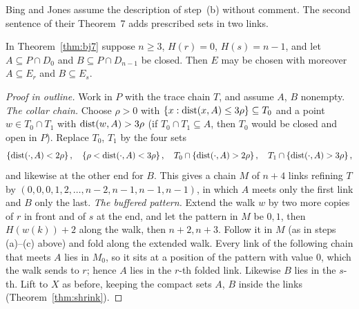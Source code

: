 
Bing and Jones assume the description of step~(b) without comment. The second sentence of their Theorem~7 adds prescribed sets in two links.

\begin{theorem}\label{thm:bj7-ends}
In Theorem~\ref{thm:bj7} suppose $n\ge3$, $H(r)=0$, $H(s)=n-1$, and let $A\subseteq P\cap D_0$ and $B\subseteq P\cap D_{n-1}$ be closed. Then $E$ may be chosen with
moreover $A\subseteq E_r$ and $B\subseteq E_s$.
\end{theorem}

\begin{proof}[Proof in outline]
Work in $P$ with the trace chain $T$, and assume $A$, $B$ nonempty.
\emph{The collar chain.} Choose $\rho>0$ with $\left\{ x:\operatorname{dist}(x,A)\le3\rho \right\}\subseteq T_0$ and a point $w\in T_0\cap T_1$ with $\operatorname{dist}(w,A)>3\rho$ (if $T_0\cap T_1\subseteq
A$, then $T_0$ would be closed and open in $P$). Replace $T_0$, $T_1$ by the four sets
\[
\left\{ \operatorname{dist}(\cdot,A)<2\rho \right\},\quad \left\{ \rho<\operatorname{dist}(\cdot,A)<3\rho \right\},\quad T_0\cap\left\{ \operatorname{dist}(\cdot,A)>2\rho \right\},\quad T_1\cap\left\{ \operatorname{dist}(\cdot,A)>3\rho \right\},
\]
and likewise at the other end for $B$. This gives a chain $M$ of $n+4$ links refining $T$ by $(0,0,0,1,2,\dots,n-2,n-1,n-1,n-1)$, in which $A$ meets only the first
link and $B$ only the last.
\emph{The buffered pattern.} Extend the walk $w$ by two more copies of $r$ in front and of $s$ at the end, and let the pattern in $M$ be $0,1$, then $H(w(k))+2$ along
the walk, then $n+2,n+3$. Follow it in $M$ (as in steps (a)--(c) above) and fold along the extended walk. Every link of the following chain that meets $A$ lies in
$M_0$, so it sits at a position of the pattern with value $0$, which the walk sends to $r$; hence $A$ lies in the $r$-th folded link. Likewise $B$ lies in the
$s$-th. Lift to $X$ as before, keeping the compact sets $A$, $B$ inside the links (Theorem~\ref{thm:shrink}).
\end{proof}


